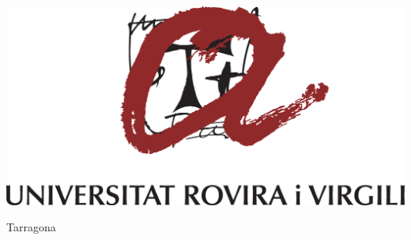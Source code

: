 \documentclass[
11pt, %
english, %
singlespacing, %
headsepline, %
]{MastersDoctoralThesis} %
\theoremstyle{definition}
\theoremstyle{definition} %
\theoremstyle{remark}
\begin{document}
\begin{titlepage}
\begin{center}
		\includegraphics[height=5.0\baselineskip]{Figures/urv/urv-centrat-color} %
		
		Tarragona\\
		{\large \the\year}\\[4cm] %
		
		
		\vfill
	\end{center}
\end{titlepage}

\cleardoublepage

\end{document}
